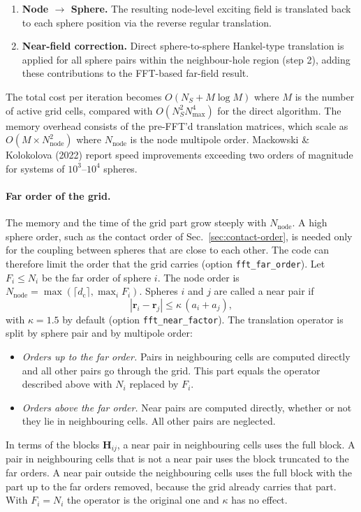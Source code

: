 \documentclass[11pt,a4paper]{article}
\begin{document}
\begin{enumerate}[nosep]
  \item \textbf{Node $\to$ Sphere.}
  The resulting node-level exciting field is translated back to each sphere position via the reverse regular translation.

  \item \textbf{Near-field correction.}
  Direct sphere-to-sphere Hankel-type translation is applied for all sphere pairs within the neighbour-hole region (step 2), adding these contributions to the FFT-based far-field result.
\end{enumerate}

The total cost per iteration becomes $O(N_S + M \log M)$ where $M$ is the number of active grid cells, compared with $O(N_S^2 N_\mathrm{max}^4)$ for the direct algorithm.
The memory overhead consists of the pre-FFT'd translation matrices, which scale as $O(M \times N_\mathrm{node}^2)$ where $N_\mathrm{node}$ is the node multipole order.
Mackowski \& Kolokolova (2022) report speed improvements exceeding two orders of magnitude for systems of $10^3$--$10^4$ spheres.

\paragraph{Far order of the grid.}
\label{sec:fft-far-order}
The memory and the time of the grid part grow steeply with $N_\mathrm{node}$.
A high sphere order, such as the contact order of Sec.~\ref{sec:contact-order}, is needed only for the coupling between spheres that are close to each other.
The code can therefore limit the order that the grid carries (option \texttt{fft\_far\_order}).
Let $F_i \leq N_i$ be the far order of sphere $i$.
The node order is $N_\mathrm{node} = \max\!\left(\lceil d_\mathrm{c} \rceil, \max_i F_i\right)$.
Spheres $i$ and $j$ are called a near pair if
\begin{equation}
  |\bm{r}_i - \bm{r}_j| \leq \kappa\,(a_i + a_j),
  \label{eq:near-pair}
\end{equation}
with $\kappa = 1.5$ by default (option \texttt{fft\_near\_factor}).
The translation operator is split by sphere pair and by multipole order:
\begin{itemize}[nosep]
  \item \emph{Orders up to the far order.}
  Pairs in neighbouring cells are computed directly and all other pairs go through the grid.
  This part equals the operator described above with $N_i$ replaced by $F_i$.
  \item \emph{Orders above the far order.}
  Near pairs are computed directly, whether or not they lie in neighbouring cells.
  All other pairs are neglected.
\end{itemize}
In terms of the blocks $\mathbf{H}_{ij}$, a near pair in neighbouring cells uses the full block.
A pair in neighbouring cells that is not a near pair uses the block truncated to the far orders.
A near pair outside the neighbouring cells uses the full block with the part up to the far orders removed, because the grid already carries that part.
With $F_i = N_i$ the operator is the original one and $\kappa$ has no effect.
\end{document}
